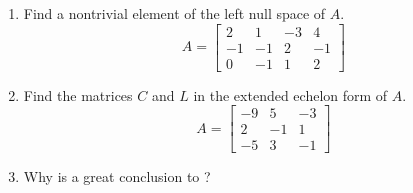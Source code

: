 \begin{enumerate}
%
\item  Find a nontrivial element of the left null space of $A$.
%
\begin{equation*}
A=
\begin{bmatrix}
2  &  1 & -3 & 4\\
-1 & -1 & 2  & -1\\
0  & -1 & 1  & 2
\end{bmatrix}
\end{equation*}
%
\item  Find the matrices $C$ and $L$ in the extended echelon form of $A$.
%
\begin{equation*}
A=
\begin{bmatrix}
 -9 & 5 & -3 \\
 2 & -1 & 1 \\
 -5 & 3 & -1
\end{bmatrix}
\end{equation*}
%
\item  Why is  a great conclusion to ?
%
\end{enumerate}
